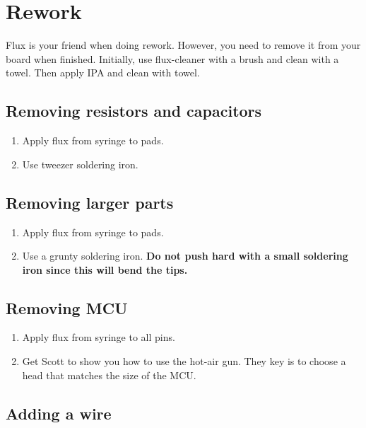 \chapter{Rework}

Flux is your friend when doing rework.  However, you need to remove it
from your board when finished.  Initially, use flux-cleaner with a
brush and clean with a towel.  Then apply IPA and clean with towel.


\section{Removing resistors and capacitors}

\begin{enumerate}
\item Apply flux from syringe to pads.

\item Use tweezer soldering iron.
\end{enumerate}


\section{Removing larger parts}


\begin{enumerate}
\item Apply flux from syringe to pads.

\item Use a grunty soldering iron.  \textbf{Do not push hard with a
  small soldering iron since this will bend the tips.}
\end{enumerate}



\section{Removing MCU}

\begin{enumerate}
\item Apply flux from syringe to all pins.

\item Get Scott to show you how to use the hot-air gun.  They key is
  to choose a head that matches the size of the MCU.
  
\end{enumerate}



\section{Adding a wire}

